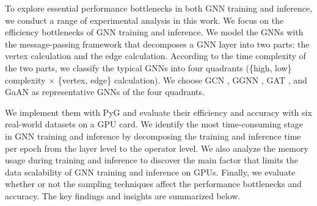To explore essential performance bottlenecks in both GNN training and inference, we conduct a range of experimental analysis in this work.
%
We focus on the efficiency bottlenecks of GNN training and inference.
%
We model the GNNs with the message-passing framework that decomposes a GNN layer into two parts: the vertex calculation and the edge calculation.
%
According to the time complexity of the two parts, we classify the typical GNNs into four quadrants (\{high, low\} complexity $\times$ \{vertex, edge\} calculation).
%
We choose GCN \cite{kipf2017_gcn}, GGNN \cite{li2015_ggnn}, GAT \cite{huang2018_gat}, and GaAN \cite{zhang2018_gaan} as representative GNNs of the four quadrants.

We implement them with PyG and evaluate their efficiency and accuracy with six real-world datasets on a GPU card.
%
We identify the most time-consuming stage in GNN training and inference by decomposing the training and inference time per epoch from the layer level to the operator level.
%
We also analyze the memory usage during training and inference to discover the main factor that limits the data scalability of GNN training and inference on GPUs. 
%
Finally, we evaluate whether or not the sampling techniques affect the performance bottlenecks and accuracy.
%
The key findings and insights are summarized below.

